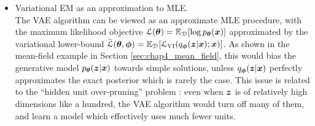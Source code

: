 \begin{itemize}
\item Variational EM as an approximation to MLE. \\
The VAE algorithm can be viewed as an approximate MLE procedure, with the maximum likelihood objective $\mathcal{L}(\bm{\theta}) = \mathbb{E}_{\mathcal{D}}[\log p_{\bm{\theta}}(\bm{x})]$ approximated by the variational lower-bound $\hat{\mathcal{L}}(\bm{\theta}, \bm{\phi}) = \mathbb{E}_{\mathcal{D}}[\mathcal{L}_{\text{VI}}(q_{\bm{\phi}}(\bm{z} | \bm{x}); \bm{x})]$. As shown in the mean-field example in Section \ref{sec:chap4_mean_field}, this would bias the generative model $p_{\bm{\theta}}(\bm{z} | \bm{x})$ towards simple solutions, unless $q_{\bm{\phi}}(\bm{z} | \bm{x})$ perfectly approximates the exact posterior which is rarely the case. This issue is related to the ``hidden unit over-pruning'' problem \citep{burda:iwae2016, sonderby:ladder_vae2016}: even when $\bm{z}$ is of relatively high dimensions like a hundred, the VAE algorithm would turn off many of them, and learn a model which effectively uses much fewer units.


\end{itemize}
